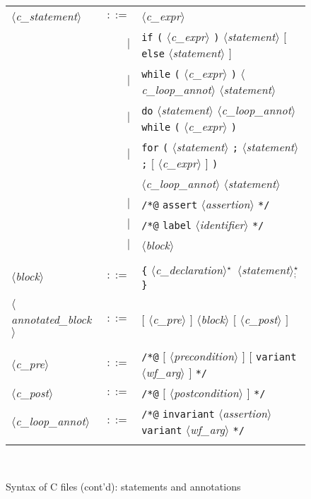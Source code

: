 \documentclass[a4paper,12pt]{report}
\makeatletter
\newcommand{\te}[1]{\texttt{#1}}
\newcommand{\nt}[1]{$\langle$\textsl{#1}$\rangle$}
\newcommand{\indextt}[1]{\index{#1@\texttt{#1}}}
\newcommand{\etoile}{$^{\star}$}
\newcommand{\etoilesep}[1]{$^{\star}_#1$}
\makeatother
\begin{document}
\begin{figure}[htbp]
\begin{center}
\hrulefill\\
\begin{tabular}{lrl}
  \nt{c\_statement}
    & $::=$ & \nt{c\_expr} \\
    &   $|$ & \te{if} \te{(} \nt{c\_expr} \te{)} \nt{statement} 
              $[$ \te{else} \nt{statement} $]$ \\
    &   $|$ & \te{while} \te{(} \nt{c\_expr} \te{)}
              \nt{c\_loop\_annot} \nt{statement} \\
    &   $|$ & \te{do} \nt{statement} \nt{c\_loop\_annot} 
              \te{while} \te{(} \nt{c\_expr} \te{)} \\
    &   $|$ & \te{for} \te{(} \nt{statement} \te{;} \nt{statement} \te{;}
              $[$ \nt{c\_expr} $]$ \te{)} \\
           && \nt{c\_loop\_annot} \nt{statement} \\
    &   $|$ & \te{/*@} \te{assert} \nt{assertion} \te{*/} \\ \indextt{assert}
    &   $|$ & \te{/*@} \te{label} \nt{identifier} \te{*/} \\ \indextt{label}
    &   $|$ & \nt{block} \\
  \\[0.1em]

  \nt{block}
    & $::=$ & \te{\{} \nt{c\_declaration}\etoile\ 
              \nt{statement}\etoilesep{\te{;}} \te{\}}\\
  \\[0.1em]

  \nt{annotated\_block}
    & $::=$ & $[$ \nt{c\_pre} $]$ \nt{block} $[$ \nt{c\_post} $]$ \\
  \\[0.1em]

  \nt{c\_pre}
    & $::=$ & \te{/*@} $[$ \nt{precondition} $]$ $[$ \te{variant} \nt{wf\_arg}
              $]$ \te{*/}  \\
  \nt{c\_post}
    & $::=$ & \te{/*@} $[$ \nt{postcondition} $]$ \te{*/}  \\
  \nt{c\_loop\_annot}
    & $::=$ & \te{/*@} \te{invariant} \nt{assertion} 
              \te{variant} \nt{wf\_arg} \te{*/}  \\
  \\[0.1em]

\end{tabular}\\
\hrulefill
\caption{Syntax of C files (cont'd): statements and annotations}
\label{fig:cfiles:b}
\end{center}           
\end{figure}


\nocite{*}




\newpage
{}
\printindex
\end{document}
